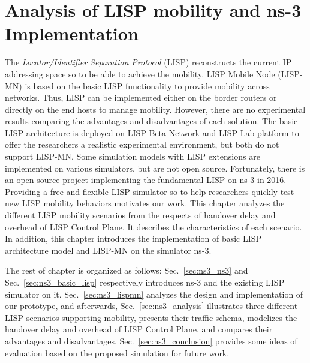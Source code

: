
\chapter{Analysis of LISP mobility and ns-3 Implementation}
\label{cha:ns-3}

\ifpdf
    \graphicspath{{Chapter7/Pics/Raster/}{Chapter7/Pics/PDF/}{Chapter7/}}
\else
    \graphicspath{{Chapter7/Pics/Vector/}{Chapter7/}}
\fi

The \emph{Locator/Identifier Separation Protocol} (LISP) reconstructs the current IP addressing space so to be able to achieve the mobility. LISP Mobile Node (LISP-MN) is based on the basic LISP functionality to provide mobility across networks. Thus, LISP can be implemented either on the border routers or directly on the end hosts to manage mobility. However, there are no experimental results comparing the advantages and disadvantages of each solution. The basic LISP architecture is deployed on LISP Beta Network and LISP-Lab platform to offer the researchers a realistic experimental environment, but both do not support LISP-MN. Some simulation models with LISP extensions are implemented on various simulators, but are not open source. Fortunately, there is an open source project implementing the fundamental LISP on ns-3 in 2016. Providing a free and flexible LISP simulator so to help researchers quickly test new LISP mobility behaviors motivates our work. This chapter analyzes the different LISP mobility scenarios from the respects of handover delay and overhead of LISP Control Plane. It describes the characteristics of each scenario. In addition, this chapter introduces the implementation of basic LISP architecture model and LISP-MN on the simulator ns-3. %

The rest of chapter is organized as follows: Sec.~\ref{sec:ns3_ns3} and Sec.~\ref{sec:ns3_basic_lisp} respectively introduces ns-3 and the existing LISP simulator on it. Sec.~\ref{sec:ns3_lispmn} analyzes the design and implementation of our prototype, and afterwards, Sec.~\ref{sec:ns3_analysis} illustrates three different LISP scenarios supporting mobility, presents their traffic schema, modelizes the handover delay and overhead of LISP Control Plane, and compares their advantages and disadvantages. %
Sec.~\ref{sec:ns3_conclusion} provides some ideas of evaluation based on the proposed simulation for future work.

